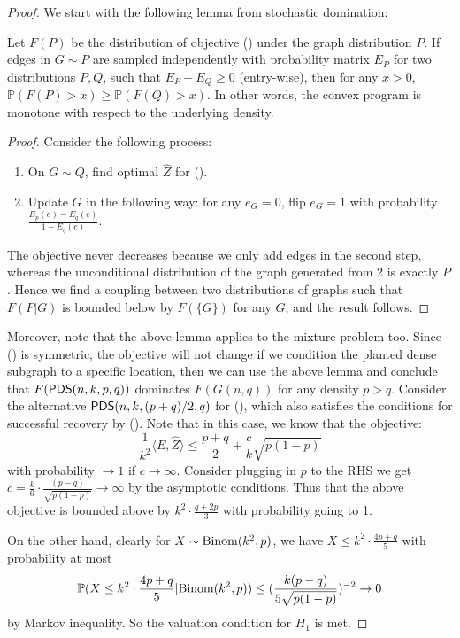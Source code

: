 \documentclass[final,12pt]{colt2023} %
\newcommand\1[1]{\mathbb{I}_{\left\{#1\right\}}}
\begin{document}
\begin{proof}
We start with the following lemma from stochastic domination: 
\begin{lemma}
Let $F(P)$ be the distribution of objective () under the graph distribution $P$. If edges in $G\sim P$ are sampled independently with probability matrix $E_P$ for two distributions $P, Q$, such that $E_P-E_Q\geq 0$ (entry-wise), then for any $x>0$, $\mathbb{P}(F(P)>x)\geq \mathbb{P}(F(Q)>x)$. In other words, the convex program is monotone with respect to the underlying density.
\end{lemma}
\begin{proof}
Consider the following process:
\begin{enumerate}
    \item On $G\sim Q$, find optimal $\hat Z$ for  ().
    \item Update $G$ in the following way: for any $e_G=0$, flip $e_G=1$ with probability $\frac{E_p(e)-E_q(e)}{1-E_q(e)}$.
\end{enumerate}
The objective never decreases because we only add edges in the second step, whereas the unconditional distribution of the graph generated from 2 is exactly $P$. Hence we find a coupling between two distributions of graphs such that $F(P|G)$ is bounded below by $F(\{G\})$ for any $G$, and the result follows.
\end{proof}
Moreover, note that the above lemma applies to the mixture problem too. Since () is symmetric, the objective will not change if we condition the planted dense subgraph to a specific location, then we can use the above lemma and conclude that $F(\mathsf{PDS}(n, k, p, q))$ dominates $F(G(n, q))$ for any density $p>q$. Consider the alternative $\mathsf{PDS}(n, k, (p+q)/2, q)$ for (), which also satisfies the conditions for successful recovery by (). Note that in this case, we know that the objective:
$$\frac{1}{k^2}\langle E, \hat Z \rangle\leq \frac{p+q}{2}+\frac{c}{k}\sqrt{p(1-p)}$$ with probability $\to 1$ if $c\to\infty$. Consider plugging in $p$ to the RHS we get $c=\frac{k}{6}\cdot\frac{(p-q)}{\sqrt{p(1-p)}}\to\infty$ by the asymptotic conditions. Thus that the above objective is bounded above by $k^2\cdot \frac{q+2p}{3}$ with probability going to 1.

\spac On the other hand, clearly for $X\sim{\rm Binom}(k^2, p)$, we have $X\leq k^2\cdot\frac{4p+q}{5}$ with probability at most $$\mathbb{P}(X\leq k^2\cdot\frac{4p+q}{5}| {\rm Binom}(k^2, p))\leq (\frac{k(p-q)}{5\sqrt{p(1-p)}})^{-2}\to 0$$by Markov inequality. So the valuation condition for $H_1$ is met.
\end{proof}
\end{document}
